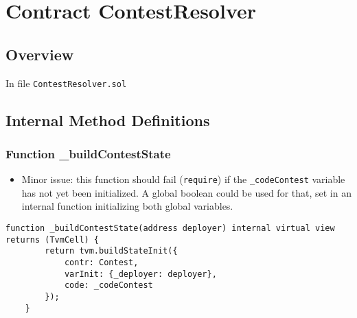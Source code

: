
\chapter{Contract ContestResolver}

\minitoc

\section{Overview}

In file {\tt ContestResolver.sol}

\section{Internal Method Definitions}

\subsection{Function \_{}buildContestState}

\begin{itemize}
\item Minor issue: this function should fail ({\tt require}) if the
  {\tt \_codeContest} variable has not yet been initialized. A global
  boolean could be used for that, set in an internal function
  initializing both global variables.
\end{itemize}

\begin{lstlisting}[firstnumber=16]
    function _buildContestState(address deployer) internal virtual view returns (TvmCell) {
        return tvm.buildStateInit({
            contr: Contest,
            varInit: {_deployer: deployer},
            code: _codeContest
        });
    }
\end{lstlisting}
